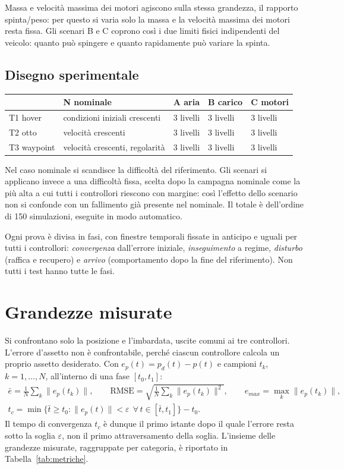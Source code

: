\documentclass[11pt,a4paper]{article}
\begin{document}
Massa e velocità massima dei motori agiscono sulla stessa grandezza, il rapporto spinta/peso: per questo si varia solo la massa e la velocità massima dei motori resta fissa. Gli scenari B e C coprono così i due limiti fisici indipendenti del veicolo: quanto può spingere e quanto rapidamente può variare la spinta.

\subsection{Disegno sperimentale}

\begin{center}
\begin{tabular}{@{}lllll@{}}
\toprule
 & N nominale & A aria & B carico & C motori \\
\midrule
T1 hover & condizioni iniziali crescenti & 3 livelli & 3 livelli & 3 livelli \\
T2 otto & velocità crescenti & 3 livelli & 3 livelli & 3 livelli \\
T3 waypoint & velocità crescenti, regolarità & 3 livelli & 3 livelli & 3 livelli \\
\bottomrule
\end{tabular}
\end{center}

Nel caso nominale si scandisce la difficoltà del riferimento. Gli scenari si applicano invece a una difficoltà fissa, scelta dopo la campagna nominale come la più alta a cui tutti i controllori riescono con margine: così l'effetto dello scenario non si confonde con un fallimento già presente nel nominale. Il totale è dell'ordine di 150 simulazioni, eseguite in modo automatico.

Ogni prova è divisa in fasi, con finestre temporali fissate in anticipo e uguali per tutti i controllori: \emph{convergenza} dall'errore iniziale, \emph{inseguimento} a regime, \emph{disturbo} (raffica e recupero) e \emph{arrivo} (comportamento dopo la fine del riferimento). Non tutti i test hanno tutte le fasi.

\section{Grandezze misurate}

Si confrontano solo la posizione e l'imbardata, uscite comuni ai tre controllori. L'errore d'assetto non è confrontabile, perché ciascun controllore calcola un proprio assetto desiderato. Con $e_p(t) = p_d(t) - p(t)$ e campioni $t_k$, $k = 1, \dots, N$, all'interno di una fase $[t_0, t_1]$:
\begin{gather*}
\bar e = \frac{1}{N}\sum_{k} \|e_p(t_k)\|, \qquad
\mathrm{RMSE} = \sqrt{\frac{1}{N}\sum_{k} \|e_p(t_k)\|^2}, \qquad
e_{max} = \max_k \|e_p(t_k)\|,\\[0.4em]
t_c = \min\big\{\bar t \ge t_0 : \|e_p(t)\| < \varepsilon \ \ \forall\, t \in [\bar t, t_1]\big\} - t_0 .
\end{gather*}
Il tempo di convergenza $t_c$ è dunque il primo istante dopo il quale l'errore resta sotto la soglia $\varepsilon$, non il primo attraversamento della soglia. L'insieme delle grandezze misurate, raggruppate per categoria, è riportato in Tabella~\ref{tab:metriche}.
\end{document}

